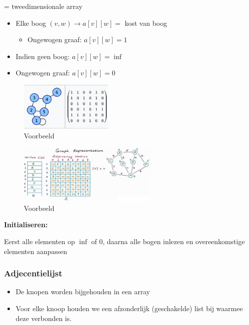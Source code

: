 \documentclass{article}
\begin{document}
= tweedimensionale array

\begin{itemize}
    \item Elke boog $(v,w) \rightarrow a[v][w] =$ kost van boog
    \begin{itemize}
        \item Ongewogen graaf: $a[v][w] = 1$
    \end{itemize} 
    \item Indien geen boog: $a[v][w] = \inf$
    \item Ongewogen graaf: $a[v][w] = 0$
\end{itemize}

\begin{figure}[H]
    \centering
    \includegraphics[width=0.4\textwidth]{adjecentiematrix.png}
    \caption{Voorbeeld}
\end{figure}

\begin{figure}[H]
    \centering
    \includegraphics[width=0.6\textwidth]{adjecentiematrix2.png}
    \caption{Voorbeeld}
\end{figure}

\textbf{Initialiseren:}

Eerst alle elementen op $\inf$ of $0$, daarna alle bogen inlezen en overeenkomstige elementen aanpassen


\subsubsection{Adjecentielijst}

\begin{itemize}
    \item De knopen worden bijgehouden in een array
    \item Voor elke knoop houden we een afzonderlijk (geschakelde) list bij waarmee deze verbonden is.
\end{itemize}
\end{document}
